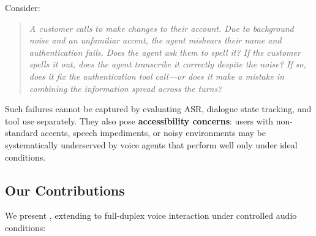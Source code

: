 Consider:

\begin{quote}
\textit{A customer calls to make changes to their account. Due to background noise and an unfamiliar accent, the agent mishears their name and authentication fails. Does the agent ask them to spell it? If the customer spells it out, does the agent transcribe it correctly despite the noise? If so, does it fix the authentication tool call---or does it make a mistake in combining the information spread across the turns?}
\end{quote}

Such failures cannot be captured by evaluating ASR, dialogue state tracking, and tool use separately. They also pose \textbf{accessibility concerns}: users with non-standard accents, speech impediments, or noisy environments may be systematically underserved by voice agents that perform well only under ideal conditions.

\subsection{Our Contributions}

We present \textbf{\tauvoice{}}, extending \tautwobench{} to full-duplex voice interaction under controlled audio conditions:

